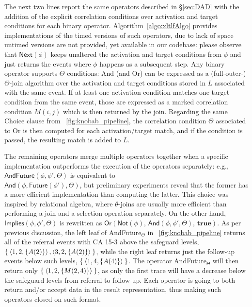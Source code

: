 The next two lines report the same operators described in \S\ref{sec:DAD} with the addition of the explicit correlation conditions over activation and target conditions for each binary operator. Algorithm~\ref{algo:xltlfAlgo} provides  implementations of the timed versions of such operators, due to lack of space untimed versions are not provided, yet available in our codebase: please observe that $\textsf{Next}(\phi)$ keeps unaltered the activation and target conditions from $\phi$ and just returns the events where $\phi$ happens as a subsequent step. Any binary operator supports $\Theta$ conditions:  \textsf{And} (and \textsf{Or}) can be expressed as a (full-outer-)$\Theta$-join algorithm over the activation and target conditions stored in $L$ associated with the same event. If at least one activation condition matches one target condition from the same event, those are expressed as a marked correlation condition $M(i,j)$ which is then returned by the join. Regarding the same \textsf{Choice} clause from \figurename~\ref{fig:knobab_pipeline}, the correlation condition $\Theta$ associated to \textsf{Or} is then computed for each activation/target match, and if the condition is passed, the resulting match is added to $L$. 


The remaining operators merge multiple operators together when 
a specific implementation outperforms
the execution of the operators separately:
 e.g., $\textsf{AndFuture}(\phi,\phi',\Theta)$ is equivalent to\\ $\textsf{And}(\phi,\textsf{Future}(\phi'),\Theta)$, but preliminary experiments reveal that the former has a more efficient implementation than computing the latter. This choice was inspired by relational algebra, where $\theta$-joins are usually more efficient than performing a join and a selection operation separately.
 On the other hand, %
 $\textsf{Implies}(\phi,\phi',\Theta)$ is rewritten as $\textsf{Or}(\textsf{Not}(\phi),\,\textsf
{And}(\phi,\phi',\Theta),\,\textbf{true})$. As per previous discussion, the left leaf of \textsf{AndFuture}$_\Theta$ in \figurename~\ref{fig:knobab_pipeline} returns all of the referral events with CA 15-3 above the safeguard levels, $\Set{\braket{1,\mbox{}\mbox{{2}},\{A(\mbox{}\mbox{{2}})\}},\braket{3,\mbox{}\mbox{{2}},\{A(\mbox{}\mbox{{2}})\}}}$, while the right leaf returns just the follow-up events below such levels, $\Set{\braket{1,\mbox{}\mbox{{4}},\{A(\mbox{}\mbox{{4}})\}}}$. The operator \textsf{AndFuture}$_\Theta$ will then return only $\Set{\braket{\mbox{}\mbox{{1}},\mbox{}\mbox{{2}},\{M(\mbox{}\mbox{{2}},\mbox{}\mbox{{4}})\}}}$, as only the first trace will have a decrease below the safeguard levels from referral to follow-up.
%
Each \xLTLf operator is going to both return and/or accept data in the result representation, thus making such operators closed on such format.





